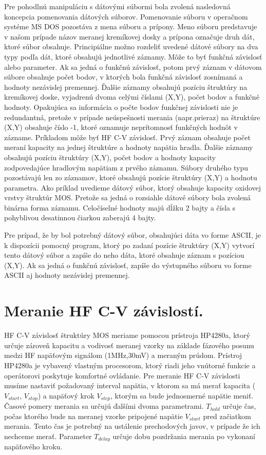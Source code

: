 Pre pohodlnú manipuláciu s dátovými súbormi bola zvolená nasledovná
koncepcia pomenovania dátových súborov. Pomenovanie súboru v operačnom
systéme MS DOS pozostáva z mena súboru a prípony.  Meno súboru
predstavuje v našom prípade názov meranej kremíkovej dosky a prípona
označuje druh dát, ktoré súbor obsahuje. Principiálne možno rozdeliť
uvedené dátové súbory na dva typy podľa dát, ktoré obsahujú jednotlivé
záznamy. Môže to byť funkčná závislosť alebo parameter. Ak sa jedná o
funkčnú závislosť, potom prvý záznam v dátovom súbore obsahuje počet
bodov, v ktorých bola funkčná závislosť zosnímaná a hodnoty nezávislej
premennej. Ďalšie záznamy obsahujú pozíciu štruktúry na kremíkovej
doske, vyjadrenú dvoma celými číslami (X,Y), počet bodov a funkčné
hodnoty.  Opakujúca sa informácia o počte bodov funkčnej závislosti
nie je redundantná, pretože v prípade neúspešnosti merania
(napr.prieraz) na štruktúre (X,Y) obsahuje číslo -1, ktoré oznamuje
neprítomnosť funkčných hodnôt v zázname. Príkladom môže byť HF C-V
závislosť. Prvý záznam obsahuje počet meraní kapacity na jednej
štruktúre a hodnoty napätia hradla. Ďalšie záznamy obsahujú pozíciu
štruktúry (X,Y), počet bodov a hodnoty kapacity zodpovedajúce
hradlovým napätiam z prvého záznamu. Súbory druhého typu pozostávajú
len zo záznamov, ktoré obsahujú pozície štruktúry (X,Y) a hodnotu
parametra. Ako príklad uvedieme dátový súbor, ktorý obsahuje kapacity
oxidovej vrstvy štruktúr MOS\@. Pretože sa jedná o rozsiahle dátové
súbory bola zvolená binárna forma záznamu.  Celočíselné hodnoty majú
dĺžku 2 bajty a čísla s pohyblivou desatinnou čiarkou zaberajú 4
bajty.

Pre prípad, že by bol potrebný dátový súbor, obsahujúci dáta vo forme
ASCII, je k dispozícii pomocný program, ktorý po zadaní pozície
štruktúry (X,Y) vytvorí tento dátový súbor a zapíše do neho dáta,
ktoré obsahuje záznam s pozíciou (X,Y). Ak sa jedná o funkčnú
závislosť, zapíše do výstupného súboru vo forme ASCII aj hodnoty
nezávislej premennej.

\section{Meranie HF C-V závislostí.}\label{sec:5.1}

HF C-V závislosť štruktúry MOS meriame pomocou prístroja HP4280a,
ktorý určuje zároveň kapacitu a vodivosť meranej vzorky na základe
fázového posunu medzi HF napäťovým signálom (1MHz,30mV) a meraným
prúdom. Prístroj HP4280a je vybavený vlastným procesorom, ktorý riadi
jeho vnútorné funkcie a operátorovi poskytuje komfortné ovládanie. Pre
meranie HF C-V závislosti musíme nastaviť požadovaný interval napätia,
v ktorom sa má merať kapacita ($V_{start}$, $V_{stop}$) a napäťový
krok $V_{step}$, ktorým sa bude jednosmerné napätie meniť. Časové
pomery merania sa určujú ďalšími dvoma parametrami. $T_{hold}$ určuje
čas, počas ktorého bude na meranej vzorke pripojené napätie
$V_{start}$ pred začiatkom merania. Tento čas je potrebný na ustálenie
prechodových javov, v prípade že ich nechceme merať. Parameter
$T_{delay}$ určuje dobu pozdržania merania po vykonaní napäťového
  kroku.

